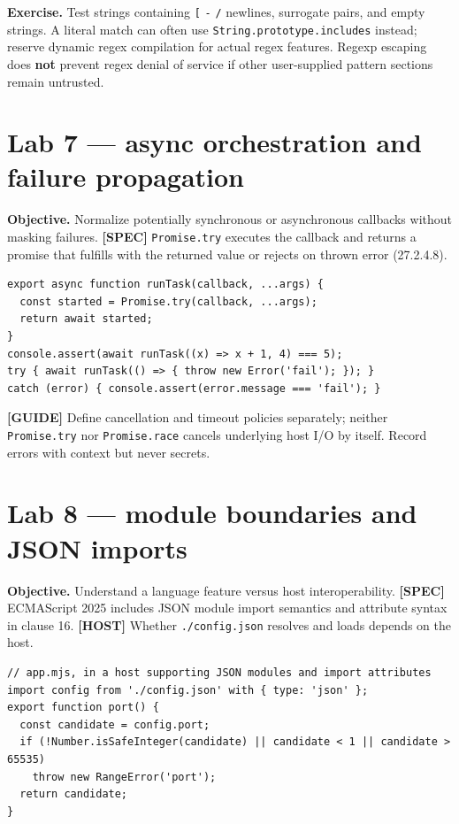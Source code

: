 \documentclass[11pt,letterpaper]{article}
\newcommand{\passthrough}[1]{#1}
\begin{document}
\textbf{Exercise.} Test strings containing \passthrough{\lstinline![!} \passthrough{\lstinline!-!} \passthrough{\lstinline!/!} newlines, surrogate pairs, and empty strings. A literal match can often use \passthrough{\lstinline!String.prototype.includes!} instead; reserve dynamic regex compilation for actual regex features. Regexp escaping does \textbf{not} prevent regex denial of service if other user-supplied pattern sections remain untrusted.

\section{Lab 7 --- async orchestration and failure propagation}\label{lab-7-async-orchestration-and-failure-propagation}

\textbf{Objective.} Normalize potentially synchronous or asynchronous callbacks without masking failures. \textbf{{[}SPEC{]}} \passthrough{\lstinline!Promise.try!} executes the callback and returns a promise that fulfills with the returned value or rejects on thrown error (27.2.4.8).

\begin{lstlisting}
export async function runTask(callback, ...args) {
  const started = Promise.try(callback, ...args);
  return await started;
}
console.assert(await runTask((x) => x + 1, 4) === 5);
try { await runTask(() => { throw new Error('fail'); }); }
catch (error) { console.assert(error.message === 'fail'); }
\end{lstlisting}

\textbf{{[}GUIDE{]}} Define cancellation and timeout policies separately; neither \passthrough{\lstinline!Promise.try!} nor \passthrough{\lstinline!Promise.race!} cancels underlying host I/O by itself. Record errors with context but never secrets.

\section{Lab 8 --- module boundaries and JSON imports}\label{lab-8-module-boundaries-and-json-imports}

\textbf{Objective.} Understand a language feature versus host interoperability. \textbf{{[}SPEC{]}} ECMAScript 2025 includes JSON module import semantics and attribute syntax in clause 16. \textbf{{[}HOST{]}} Whether \passthrough{\lstinline!./config.json!} resolves and loads depends on the host.

\begin{lstlisting}
// app.mjs, in a host supporting JSON modules and import attributes
import config from './config.json' with { type: 'json' };
export function port() {
  const candidate = config.port;
  if (!Number.isSafeInteger(candidate) || candidate < 1 || candidate > 65535)
    throw new RangeError('port');
  return candidate;
}
\end{lstlisting}
\end{document}
